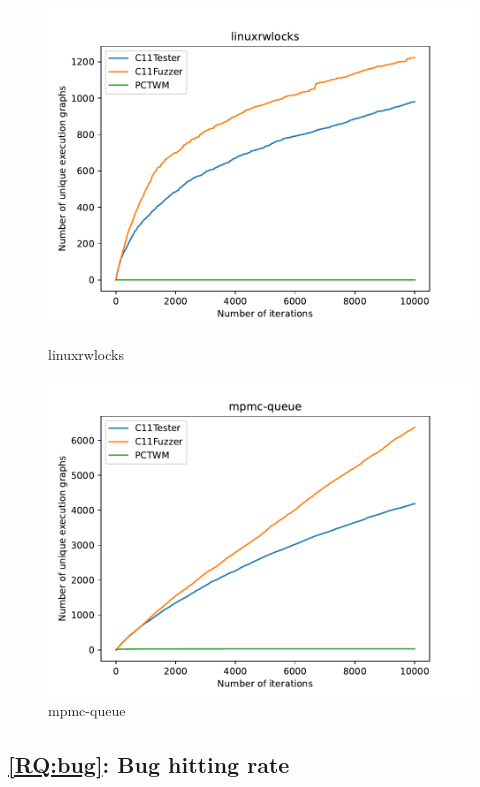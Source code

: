 \begin{figure}[H]
    \begin{minipage}{0.45\textwidth}
		\centering
		\includegraphics[width=\textwidth]{figure/pctwm/linuxrwlocks.pdf}
		\caption{linuxrwlocks}
		\label{pctwm-linuxrwlocks}
	\end{minipage}
	\hfill
	\begin{minipage}{0.45\textwidth}
		\centering
		\includegraphics[width=\textwidth]{figure/pctwm/mpmc-queue.pdf}
		\caption{mpmc-queue}
		\label{pctwm-mpmc-queue}
	\end{minipage}
	\vspace{0.5cm}

\end{figure}


\subsection{\ref*{RQ:bug}: Bug hitting rate}

